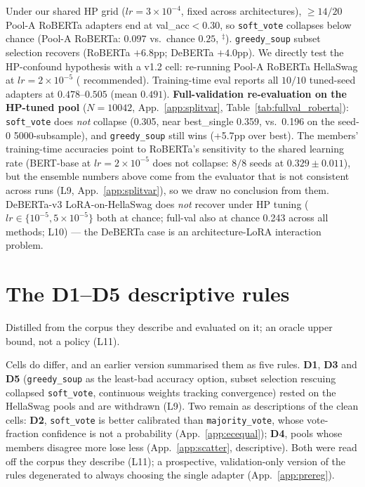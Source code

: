 \documentclass[11pt]{article}
\begin{document}
Under our shared HP grid ($lr{=}3{\times}10^{-4}$, fixed across architectures), $\geq 14/20$ Pool-A RoBERTa adapters end at val\_acc${<}0.30$, so \texttt{soft\_vote} collapses below chance (Pool-A RoBERTa: $0.097$ vs.\ chance $0.25$, $^{\ddagger}$). \texttt{greedy\_soup} subset selection recovers (RoBERTa $+6.8$pp; DeBERTa $+4.0$pp). We directly test the HP-confound hypothesis with a v1.2 cell: re-running Pool-A RoBERTa HellaSwag at $lr{=}2{\times}10^{-5}$ (\citealp{liu2019roberta} recommended). Training-time eval reports all $10/10$ tuned-seed adapters at $0.478$--$0.505$ (mean $0.491$). \textbf{Full-validation re-evaluation on the HP-tuned pool} ($N{=}10042$, App.~\ref{app:splitvar}, Table~\ref{tab:fullval_roberta}): \texttt{soft\_vote} does \emph{not} collapse (0.305, near best\_single 0.359, vs.\ 0.196 on the seed-0 5000-subsample), and \texttt{greedy\_soup} still wins (+5.7pp over best). The members' training-time accuracies point to RoBERTa's sensitivity to the shared learning rate (BERT-base at $lr{=}2{\times}10^{-5}$ does not collapse: $8/8$ seeds at $0.329 \pm 0.011$), but the ensemble numbers above come from the evaluator that is not consistent across runs (L9, App.~\ref{app:splitvar}), so we draw no conclusion from them. DeBERTa-v3 LoRA-on-HellaSwag does \emph{not} recover under HP tuning ($lr{\in}\{10^{-5}, 5{\times}10^{-5}\}$ both at chance; full-val also at chance 0.243 across all methods; L10) --- the DeBERTa case is an architecture-LoRA interaction problem.

\section{The D1--D5 descriptive rules}\label{app:rules}
Distilled from the corpus they describe and evaluated on it; an oracle upper bound, not a policy (L11).

Cells do differ, and an earlier version summarised them as five rules. \textbf{D1}, \textbf{D3} and \textbf{D5} (\texttt{greedy\_soup} as the least-bad accuracy option, subset selection rescuing collapsed \texttt{soft\_vote}, continuous weights tracking convergence) rested on the HellaSwag pools and are withdrawn (L9). Two remain as descriptions of the clean cells: \textbf{D2}, \texttt{soft\_vote} is better calibrated than \texttt{majority\_vote}, whose vote-fraction confidence is not a probability (App.~\ref{app:ecequal}); \textbf{D4}, pools whose members disagree more lose less (App.~\ref{app:scatter}, descriptive). Both were read off the corpus they describe (L11); a prospective, validation-only version of the rules degenerated to always choosing the single adapter (App.~\ref{app:prereg}).
\end{document}
